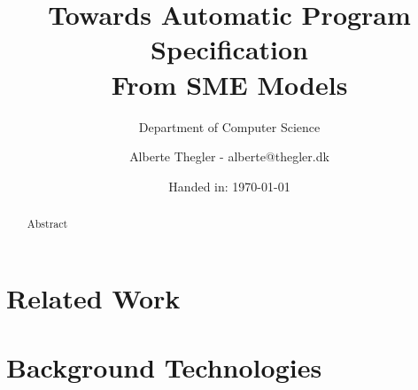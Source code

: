 \documentclass[a4paper]{report}
\author{Alberte Thegler - alberte@thegler.dk}
\title{Towards Automatic Program Specification \\ From SME Models}
\subtitle{Department of Computer Science}
\date{Handed in: \today}
\begin{document}
\maketitle

\begin{abstract}
\begin{doublespace}
Abstract
\end{doublespace}
\end{abstract}


\newpage
\tableofcontents

\newpage
{}



% 
%
%
\chapter{Related Work}
\label{chap:related_work}

%
% 
%
\chapter{Background Technologies}
\label{chap:background}

% 
%
% 
%
% 
\end{document}
